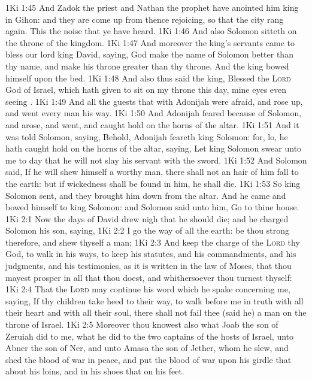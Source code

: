 \vs 1Ki 1:45 And Zadok the priest and Nathan the prophet have anointed him king in Gihon: and they are come up from thence rejoicing, so that the city rang again. This  the noise that ye have heard.
\vs 1Ki 1:46 And also Solomon sitteth on the throne of the kingdom.
\vs 1Ki 1:47 And moreover the king's servants came to bless our lord king David, saying, God make the name of Solomon better than thy name, and make his throne greater than thy throne. And the king bowed himself upon the bed.
\vs 1Ki 1:48 And also thus said the king, Blessed  the \textsc{Lord} God of Israel, which hath given  to sit on my throne this day, mine eyes even seeing .
\vs 1Ki 1:49 And all the guests that  with Adonijah were afraid, and rose up, and went every man his way.
\vs 1Ki 1:50 And Adonijah feared because of Solomon, and arose, and went, and caught hold on the horns of the altar.
\vs 1Ki 1:51 And it was told Solomon, saying, Behold, Adonijah feareth king Solomon: for, lo, he hath caught hold on the horns of the altar, saying, Let king Solomon swear unto me to day that he will not slay his servant with the sword.
\vs 1Ki 1:52 And Solomon said, If he will shew himself a worthy man, there shall not an hair of him fall to the earth: but if wickedness shall be found in him, he shall die.
\vs 1Ki 1:53 So king Solomon sent, and they brought him down from the altar. And he came and bowed himself to king Solomon: and Solomon said unto him, Go to thine house.
\vs 1Ki 2:1 Now the days of David drew nigh that he should die; and he charged Solomon his son, saying,
\vs 1Ki 2:2 I go the way of all the earth: be thou strong therefore, and shew thyself a man;
\vs 1Ki 2:3 And keep the charge of the \textsc{Lord} thy God, to walk in his ways, to keep his statutes, and his commandments, and his judgments, and his testimonies, as it is written in the law of Moses, that thou mayest prosper in all that thou doest, and whithersoever thou turnest thyself:
\vs 1Ki 2:4 That the \textsc{Lord} may continue his word which he spake concerning me, saying, If thy children take heed to their way, to walk before me in truth with all their heart and with all their soul, there shall not fail thee (said he) a man on the throne of Israel.
\vs 1Ki 2:5 Moreover thou knowest also what Joab the son of Zeruiah did to me,  what he did to the two captains of the hosts of Israel, unto Abner the son of Ner, and unto Amasa the son of Jether, whom he slew, and shed the blood of war in peace, and put the blood of war upon his girdle that  about his loins, and in his shoes that  on his feet.
